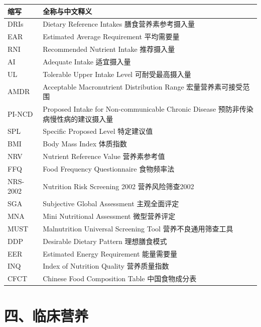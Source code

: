 \begin{table}[H]
\centering
\begin{tabularx}{\textwidth}{lX}
\toprule
\textbf{缩写} & \textbf{全称与中文释义} \\
\midrule
DRIs & Dietary Reference Intakes \hfill 膳食营养素参考摄入量 \\
EAR & Estimated Average Requirement \hfill 平均需要量 \\
RNI & Recommended Nutrient Intake \hfill 推荐摄入量 \\
AI & Adequate Intake \hfill 适宜摄入量 \\
UL & Tolerable Upper Intake Level \hfill 可耐受最高摄入量 \\
AMDR & Acceptable Macronutrient Distribution Range \hfill 宏量营养素可接受范围 \\
PI-NCD & Proposed Intake for Non-communicable Chronic Disease \hfill 预防非传染病慢性病的建议摄入量 \\
SPL & Specific Proposed Level \hfill 特定建议值 \\
BMI & Body Mass Index \hfill 体质指数 \\
NRV & Nutrient Reference Value \hfill 营养素参考值 \\
FFQ & Food Frequency Questionnaire \hfill 食物频率法 \\
NRS-2002 & Nutrition Risk Screening 2002 \hfill 营养风险筛查2002 \\
SGA & Subjective Global Assessment \hfill 主观全面评定 \\
MNA & Mini Nutritional Assessment \hfill 微型营养评定 \\
MUST & Malnutrition Universal Screening Tool \hfill 营养不良通用筛查工具 \\
DDP & Desirable Dietary Pattern \hfill 理想膳食模式 \\
EER & Estimated Energy Requirement \hfill 能量需要量 \\
INQ & Index of Nutrition Quality \hfill 营养质量指数 \\
CFCT & Chinese Food Composition Table \hfill 中国食物成分表 \\
\bottomrule
\end{tabularx}
\end{table}

\section{四、临床营养}

